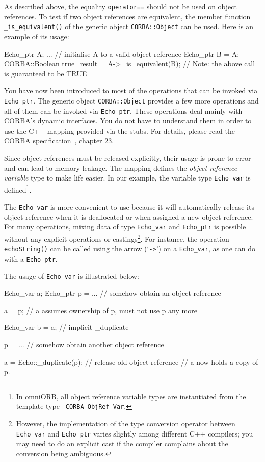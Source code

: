 \documentclass[11pt,twoside,a4paper]{book}
\newcommand{\type}[1]{\texttt{#1}}
\newcommand{\code}[1]{\texttt{#1}}
\newcommand{\op}[1]{\texttt{#1()}}
\newcommand{\term}[1]{\textit{#1}}
\begin{document}
As described above, the equality \code{operator==} should not be used
on object references. To test if two object references are equivalent,
the member function \op{\_is\_equivalent} of the generic object
\type{CORBA::Object} can be used. Here is an example of its usage:

\begin{cxxlisting}
Echo_ptr A;
...            // initialise A to a valid object reference 
Echo_ptr B = A;
CORBA::Boolean true_result = A->_is_equivalent(B); 
// Note: the above call is guaranteed to be TRUE
\end{cxxlisting}

You have now been introduced to most of the operations that can be
invoked via \type{Echo\_ptr}. The generic object \type{CORBA::Object}
provides a few more operations and all of them can be invoked via
\type{Echo\_ptr}. These operations deal mainly with CORBA's dynamic
interfaces. You do not have to understand them in order to use the C++
mapping provided via the stubs. For details, please read the CORBA
specification~\cite{corba23-spec}, chapter 23.

Since object references must be released explicitly, their usage is
prone to error and can lead to memory leakage. The mapping defines the
\term{object reference variable} type to make life easier. In our
example, the variable type \type{Echo\_var} is defined\footnote{In
omniORB, all object reference variable types are instantiated from the
template type \type{\_CORBA\_ObjRef\_Var}.}.

The \type{Echo\_var} is more convenient to use because it will
automatically release its object reference when it is deallocated or
when assigned a new object reference. For many operations, mixing data
of type \type{Echo\_var} and \type{Echo\_ptr} is possible without any
explicit operations or castings\footnote{However, the implementation
of the type conversion operator between \type{Echo\_var} and
\type{Echo\_ptr} varies slightly among different C++ compilers; you
may need to do an explicit cast if the compiler complains about the
conversion being ambiguous.}. For instance, the operation
\op{echoString} can be called using the arrow (`\code{->}') on a
\type{Echo\_var}, as one can do with a \type{Echo\_ptr}.

The usage of \type{Echo\_var} is illustrated below:


\begin{cxxlisting}
Echo_var a;
Echo_ptr p = ... // somehow obtain an object reference

a = p;           // a assumes ownership of p, must not use p any more

Echo_var b = a;  // implicit _duplicate

p = ...          // somehow obtain another object reference

a = Echo::_duplicate(p);     // release old object reference
                             // a now holds a copy of p.
\end{cxxlisting}
\end{document}
